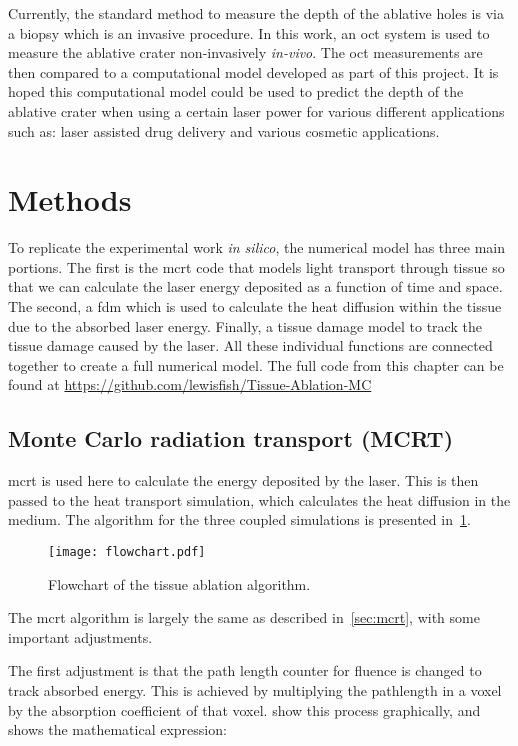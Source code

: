 Currently, the standard method to measure the depth of the ablative holes is via a biopsy which is an invasive procedure. In this work, an \gls*{oct} system is used to measure the ablative crater non-invasively \textit{in-vivo}. The \gls*{oct} measurements are then compared to a computational model developed as part of this project. It is hoped this computational model could be used to predict the depth of the ablative crater when using a certain laser power for various different applications such as: laser assisted drug delivery and various cosmetic applications.


\section{Methods}

To replicate the experimental work \textit{in silico}, the numerical model has three main portions. The first is the \gls*{mcrt} code that models light transport through tissue so that we can calculate the laser energy deposited as a function of time and space. The second, a \gls*{fdm} which is used to calculate the heat diffusion within the tissue due to the absorbed laser energy. Finally, a tissue damage model to track the tissue damage caused by the laser. All these individual functions are connected together to create a full numerical model.
The full code from this chapter can be found at \url{https://github.com/lewisfish/Tissue-Ablation-MC}

\subsection{Monte Carlo radiation transport (MCRT)}

\gls*{mcrt} is used here to calculate the energy deposited by the laser. This is then passed to the heat transport simulation, which calculates the heat diffusion in the medium. The algorithm for the three coupled simulations is presented in~\cref{fig:algoablation}.

\begin{figure}[!htbp]
\centering
\texttt{[image: flowchart.pdf]}
\caption{Flowchart of the tissue ablation algorithm.}
\label{fig:algoablation}
\end{figure}

The \gls*{mcrt} algorithm is largely the same as described in~\cref{sec:mcrt}, with some important adjustments.

The first adjustment is that the path length counter for fluence is changed to track absorbed energy. This is achieved by multiplying the pathlength in a voxel by the absorption coefficient of that voxel.  show this process graphically, and  shows the mathematical expression:

